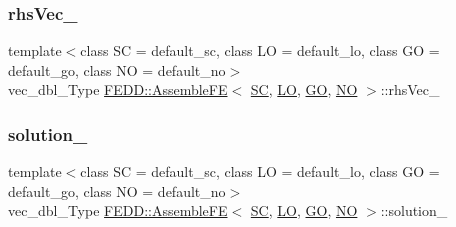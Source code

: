 \subsubsection{\texorpdfstring{rhs\+Vec\+\_\+}{rhsVec\_}}
{\footnotesize\ttfamily template$<$class SC  = default\+\_\+sc, class LO  = default\+\_\+lo, class GO  = default\+\_\+go, class NO  = default\+\_\+no$>$ \\
vec\+\_\+dbl\+\_\+\+Type \hyperlink{classFEDD_1_1AssembleFE}{F\+E\+D\+D\+::\+Assemble\+FE}$<$ \hyperlink{fe__test__laplace_8cpp_a79c7e86a57edbb2a5a53242bcd04e41e}{SC}, \hyperlink{fe__test__laplace_8cpp_ad6a38c9f07d3fd633eefca5bccad8410}{LO}, \hyperlink{fe__test__laplace_8cpp_afa2946b509009b4f45eb04bd8c5b27d9}{GO}, \hyperlink{fe__test__laplace_8cpp_a5e24f37b28787429872b6ecb1d0417ce}{NO} $>$\+::rhs\+Vec\+\_\+\hspace{0.3cm}{\ttfamily [protected]}}

\mbox{\label{classFEDD_1_1AssembleFE_a5a0789e00592c0885abac42748c96fd7}} 
\subsubsection{\texorpdfstring{solution\+\_\+}{solution\_}}
{\footnotesize\ttfamily template$<$class SC  = default\+\_\+sc, class LO  = default\+\_\+lo, class GO  = default\+\_\+go, class NO  = default\+\_\+no$>$ \\
vec\+\_\+dbl\+\_\+\+Type \hyperlink{classFEDD_1_1AssembleFE}{F\+E\+D\+D\+::\+Assemble\+FE}$<$ \hyperlink{fe__test__laplace_8cpp_a79c7e86a57edbb2a5a53242bcd04e41e}{SC}, \hyperlink{fe__test__laplace_8cpp_ad6a38c9f07d3fd633eefca5bccad8410}{LO}, \hyperlink{fe__test__laplace_8cpp_afa2946b509009b4f45eb04bd8c5b27d9}{GO}, \hyperlink{fe__test__laplace_8cpp_a5e24f37b28787429872b6ecb1d0417ce}{NO} $>$\+::solution\+\_\+\hspace{0.3cm}{\ttfamily [protected]}}

\mbox{\label{classFEDD_1_1AssembleFE_aaa84c5ca06ca8dcd1ad82d7d66ac8e4c}} 

